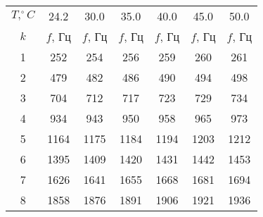 \begin{tabular}{ccccccc}
\toprule
$T, ^{\circ} C$ & 24.2 & 30.0 & 35.0 & 40.0 & 45.0 & 50.0\\
$k$ & $f$, Гц & $f$, Гц & $f$, Гц & $f$, Гц & $f$, Гц & $f$, Гц \\
\midrule
1 & 252	 & 254	& 256 	& 259  & 260  & 261  \\
2 & 479	 & 482	& 486 	& 490  & 494  & 498  \\
3 & 704	 & 712	& 717 	& 723  & 729  & 734  \\
4 & 934	 & 943	& 950 	& 958  & 965  & 973  \\
5 & 1164 & 1175	& 1184	& 1194 & 1203 & 1212 \\
6 & 1395 & 1409	& 1420	& 1431 & 1442 & 1453 \\
7 & 1626 & 1641	& 1655	& 1668 & 1681 & 1694 \\
8 & 1858 & 1876	& 1891	& 1906 & 1921 & 1936 \\
\bottomrule
\end{tabular}